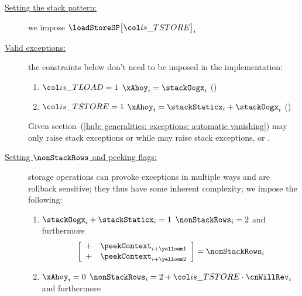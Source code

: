 \begin{center}
\end{center}

\begin{description}
	\item[\underline{Setting the stack pattern:}]
		we impose $\loadStoreSP\big[ \locIsTstore \big]_{i}$
	\item[\underline{Valid exceptions:}]
		the constraints below don't need to be imposed in the implementation:
		\begin{enumerate}
			\item \If $\locIsTload  = 1$ \Then $\xAhoy_{i} = \stackOogx_{i}$ \quad (\trash)
			\item \If $\locIsTstore = 1$ \Then $\xAhoy_{i} = \stackStaticx_{i} + \stackOogx_{i}$ \quad (\trash)
		\end{enumerate}
		\saNote{}
		Given section~(\ref{hub: generalities: exceptions: automatic vanishing})
		 may only raise stack exceptions or \oogxSH{}
		while  may raise stack exceptions, \staticxSH{} or \oogxSH{}.
	\item[\underline{Setting $\nonStackRows$ and peeking flags:}]
		\label{hub: instruction handling: storage: non stack rows and peeking flags}
		storage operations can provoke exceptions in multiple ways and are rollback sensitive;
		they thus have some inherent complexity;
		we impose the following:
		\begin{enumerate}
			\item \If $\stackOogx _{i} + \stackStaticx _{i} = 1$ \Then $\nonStackRows_{i} = 2$ and furthermore
				\[
					\left[ \begin{array}{cr}
						+ & \peekContext _{i + \locTransientCurrContextRow        } \\
						+ & \peekContext _{i + \locTransientPrntContextRowStaticx } \\
					\end{array} \right]
					=
					\nonStackRows _{i}
				\]
			\item \If $\xAhoy_{i} = 0$ \Then $\nonStackRows_{i} = 2 + \locIsTstore \cdot \cnWillRev_{i}$ and furthermore
				\[
\]
\end{enumerate}
\end{description}
